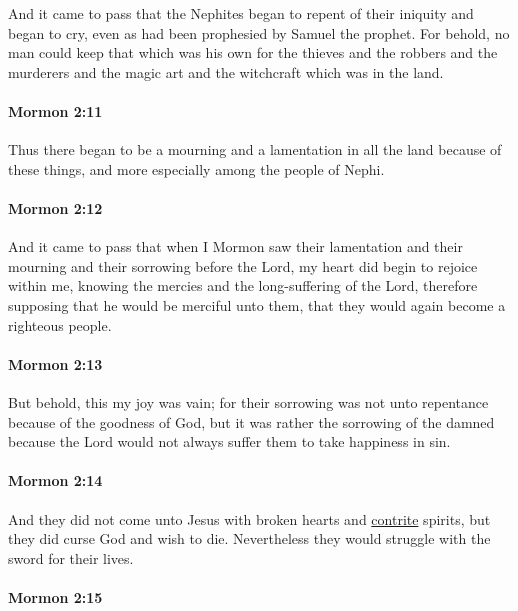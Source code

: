 			And it came to pass that the Nephites began to repent of their iniquity
			and began to cry, even as had been prophesied by Samuel the prophet.
			For behold, no man could keep that which was his own
			for the thieves and the robbers and the murderers
			and the magic art and the witchcraft which was in the land.

		\paragraph{Mormon 2:11} %
			\label{MORMON-2-11}

			Thus there began to be a mourning and a lamentation in all the land
			because of these things,
			and more especially among the people of Nephi.

		\paragraph{Mormon 2:12} %
			\label{MORMON-2-12}

			And it came to pass that when I Mormon saw their lamentation
			and their mourning and their sorrowing before the Lord,
			my heart did begin to rejoice within me,
			knowing the mercies and the long-suffering of the Lord,
			therefore supposing that he would be merciful unto them,
			that they would again become a righteous people.

		\paragraph{Mormon 2:13} %
			\label{MORMON-2-13}

			But behold, this my joy was vain;
			for their sorrowing was not unto repentance because of the goodness of God,
			but it was rather the sorrowing of the damned
			because the Lord would not always suffer them to take happiness in sin.

		\paragraph{Mormon 2:14} %
			\label{MORMON-2-14}

			And they did not come unto Jesus with broken hearts and \hyperref[CONTRITE]{contrite} spirits,
			but they did curse God and wish to die.
			Nevertheless they would struggle with the sword for their lives.

		\paragraph{Mormon 2:15} %
			\label{MORMON-2-15}

